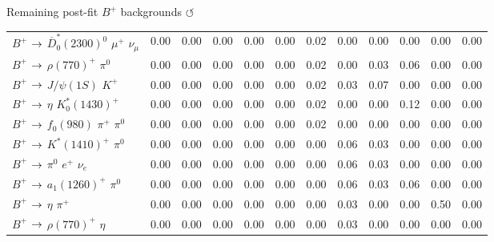 \documentclass[xcolor=dvipsnames]{beamer}
\begin{document}
\begin{frame}{Remaining post-fit $B^+$ backgrounds \hyperlink{frame:A}{$\circlearrowleft$}}
{\begin{tabular}{lrrrrrrrrrrr}
      $B^{+}$ $\rightarrow$ $\overline{D}_{0}^{*}(2300)^{0}$ $\mu^{+}$ $\nu_{\mu}$ &         0.00 &         0.00 &         0.00 &         0.00 &         0.00 &         0.02 &         0.00 &         0.00 &         0.00 &         0.00 &         0.00 \\
      $B^{+}$ $\rightarrow$ $\rho(770)^{+}$ $\pi^{0}$                              &         0.00 &         0.00 &         0.00 &         0.00 &         0.00 &         0.02 &         0.00 &         0.03 &         0.06 &         0.00 &         0.00 \\
      $B^{+}$ $\rightarrow$ $J/\psi(1S)$ $K^{+}$                                   &         0.00 &         0.00 &         0.00 &         0.00 &         0.00 &         0.02 &         0.03 &         0.07 &         0.00 &         0.00 &         0.00 \\
      $B^{+}$ $\rightarrow$ $\eta$ $K_{0}^{*}(1430)^{+}$                           &         0.00 &         0.00 &         0.00 &         0.00 &         0.00 &         0.02 &         0.00 &         0.00 &         0.12 &         0.00 &         0.00 \\
      $B^{+}$ $\rightarrow$ $f_{0}(980)$ $\pi^{+}$ $\pi^{0}$                       &         0.00 &         0.00 &         0.00 &         0.00 &         0.00 &         0.02 &         0.00 &         0.00 &         0.00 &         0.00 &         0.00 \\
      $B^{+}$ $\rightarrow$ $K^{*}(1410)^{+}$ $\pi^{0}$                            &         0.00 &         0.00 &         0.00 &         0.00 &         0.00 &         0.00 &         0.06 &         0.03 &         0.00 &         0.00 &         0.00 \\
      $B^{+}$ $\rightarrow$ $\pi^{0}$ $e^{+}$ $\nu_{e}$                            &         0.00 &         0.00 &         0.00 &         0.00 &         0.00 &         0.00 &         0.06 &         0.03 &         0.00 &         0.00 &         0.00 \\
      $B^{+}$ $\rightarrow$ $a_{1}(1260)^{+}$ $\pi^{0}$                            &         0.00 &         0.00 &         0.00 &         0.00 &         0.00 &         0.00 &         0.06 &         0.03 &         0.06 &         0.00 &         0.00 \\
      $B^{+}$ $\rightarrow$ $\eta$ $\pi^{+}$                                       &         0.00 &         0.00 &         0.00 &         0.00 &         0.00 &         0.00 &         0.03 &         0.00 &         0.00 &         0.50 &         0.00 \\
      $B^{+}$ $\rightarrow$ $\rho(770)^{+}$ $\eta$                                 &         0.00 &         0.00 &         0.00 &         0.00 &         0.00 &         0.00 &         0.03 &         0.00 &         0.00 &         0.00 &         0.00 \\

\end{tabular}}
\end{frame}
\end{document}
